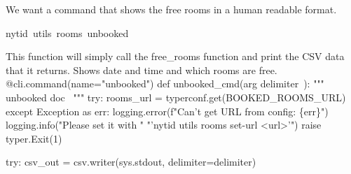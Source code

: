 We want a command that shows the free rooms in a human readable format.
\begin{center}
{\Tt{}nytid\ utils\ rooms\ unbooked\nwendquote}
\end{center}
This function will simply call the {\Tt{}free{\_}rooms\nwendquote} function and print the CSV 
data that it returns.
\nwenddocs{}\endmoddef\nwstartdeflinemarkup{}\nwenddeflinemarkup
Shows date and time and which rooms are free.
\nwendcode{}\plusendmoddef\nwstartdeflinemarkup{}\nwenddeflinemarkup
@cli.command(name="unbooked")
def unbooked_cmd(\LA{}arg \code{}delimiter\edoc{}~{\nwtagstyle{}}\RA{}):
  """
  \LA{}\code{}unbooked\edoc{} doc~{\nwtagstyle{}}\RA{}
  """
  try:
    rooms_url = typerconf.get(BOOKED_ROOMS_URL)
  except Exception as err:
    logging.error(f"Can't get URL from config: \{err\}")
    logging.info("Please set it with "
                 "'nytid utils rooms set-url <url>'")
    raise typer.Exit(1)

  try:
    csv_out = csv.writer(sys.stdout, delimiter=delimiter)

